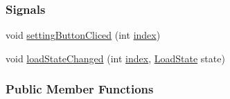 \subsubsection*{Signals}
\begin{DoxyCompactItemize}
\item 
void \mbox{\hyperlink{classHeadForm_ad5033138e38409217e1ae343c71afc64}{setting\+Button\+Cliced}} (int \mbox{\hyperlink{classHeadForm_a5e01a73f3b47bdc85ea85f5650cdf0d0}{index}})
\item 
void \mbox{\hyperlink{classHeadForm_a6e4fb0f70f7571685094e53836bcbe21}{load\+State\+Changed}} (int \mbox{\hyperlink{classHeadForm_a5e01a73f3b47bdc85ea85f5650cdf0d0}{index}}, \mbox{\hyperlink{headform_8h_a56d194976643934b3332b3f99d82490d}{Load\+State}} state)
\end{DoxyCompactItemize}
\subsubsection*{Public Member Functions}
